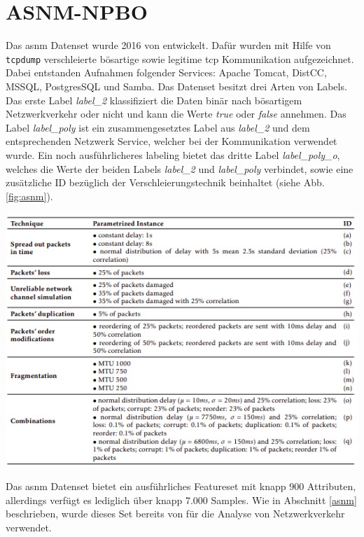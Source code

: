 \documentclass[
    12pt, %
    DIV10,
    ngerman, %
    a4paper, %
    oneside, %
    titlepage, %
    parskip=half, %
    headings=normal, %
    listof=totoc, %
    bibliography=totoc, %
    index=totoc, %
    captions=tableheading, %
    final %
]{scrreprt}
\begin{document}
\section{ASNM-NPBO}
Das \ac{asnm} Datenset wurde 2016 von \textcite{phdthesis} entwickelt. Dafür wurden mit Hilfe von \texttt{tcpdump} verschleierte bösartige sowie legitime \ac{tcp} Kommunikation aufgezeichnet. Dabei entstanden Aufnahmen folgender Services: Apache Tomcat, DistCC, MSSQL, PostgresSQL und Samba. Das Datenset besitzt drei Arten von Labels. Das erste Label \emph{label\_2} klassifiziert die Daten binär nach bösartigem Netzwerkverkehr oder nicht und kann die Werte \emph{true} oder \emph{false} annehmen. Das Label \emph{label\_poly} ist ein zusammengesetztes Label aus \emph{label\_2} und dem entsprechenden Netzwerk Service, welcher bei der Kommunikation verwendet wurde. Ein noch ausführlicheres labeling bietet das dritte Label \emph{label\_poly\_o}, welches die Werte der beiden Labels \emph{label\_2} und \emph{label\_poly} verbindet, sowie eine zusätzliche ID bezüglich der Verschleierungstechnik beinhaltet (siehe Abb. \ref{fig:asnm}).
\begin{center}
\includegraphics[scale=0.7]{img/asnm.png}
\label{fig:asnm}
\end{center}
Das \ac{asnm} Datenset bietet ein ausführliches Featureset mit knapp 900 Attributen, allerdings verfügt es lediglich über knapp 7.000 Samples. Wie in Abschnitt \ref{asnm} beschrieben, wurde dieses Set bereits von \textcite{Teoh2018} für die Analyse von Netzwerkverkehr verwendet.
\end{document}
